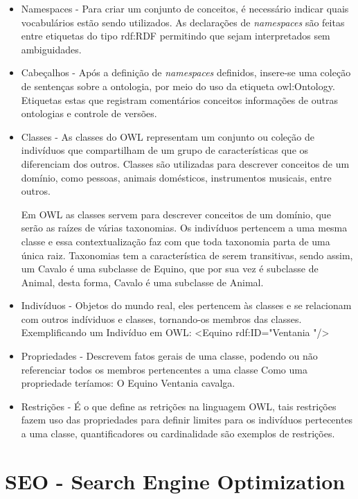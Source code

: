 \begin{itemize}
	\item Namespaces - Para criar um conjunto de conceitos, é necessário indicar quais vocabulários estão sendo utilizados. As declarações de \textit{namespaces} são feitas entre etiquetas do tipo rdf:RDF permitindo que sejam interpretados sem ambiguidades.
	\item Cabeçalhos - Após a definição de \textit{namespaces} definidos, insere-se uma coleção de sentenças sobre a ontologia, por meio do uso da etiqueta owl:Ontology. Etiquetas estas que registram comentários conceitos informações de outras ontologias e controle de versões.
	\item Classes - As classes do OWL representam um conjunto ou coleção de indivíduos que compartilham de um grupo de características que os diferenciam dos outros. Classes são utilizadas para descrever conceitos de um domínio, como pessoas, animais domésticos, instrumentos musicais, entre outros.

Em OWL as classes servem para descrever conceitos de um domínio, que serão as raízes de várias taxonomias. Os indivíduos pertencem a uma mesma classe e essa contextualização faz com que toda taxonomia parta de uma única raiz. Taxonomias tem a característica de serem transitivas, sendo assim, um Cavalo é uma subclasse de Equino, que por sua vez é subclasse de Animal, desta forma, Cavalo é uma subclasse de Animal.
	
	\item Indivíduos - Objetos do mundo real, eles pertencem às classes e se relacionam com outros indíviduos e classes, tornando-os membros das classes.
	\subitem Exemplificando um Indivíduo em OWL: <Equino rdf:ID="Ventania "/>
	\item Propriedades - Descrevem fatos gerais de uma classe, podendo ou não referenciar todos os membros pertencentes a uma classe
	\subitem Como uma propriedade teríamos: O Equino Ventania cavalga.
	\item Restrições - É o que define as retrições na linguagem OWL, tais restrições fazem uso das propriedades para definir limites para os indivíduos pertecentes a uma classe, quantificadores ou cardinalidade são exemplos de restrições.
\end{itemize}

\section{SEO - Search Engine Optimization}

